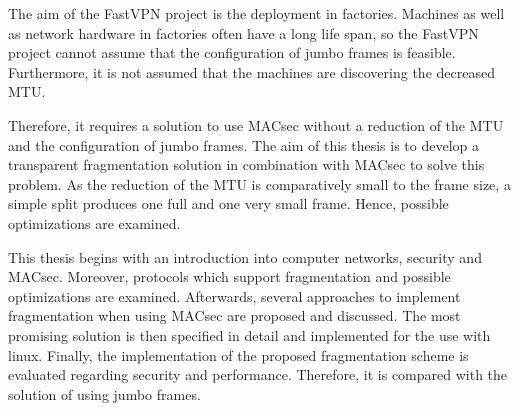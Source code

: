 The aim of the FastVPN project is the deployment in factories.
Machines as well as network hardware in factories often have a long life span, so the FastVPN project cannot assume that the configuration of jumbo frames is feasible.
Furthermore, it is not assumed that the machines are discovering the decreased \gls{MTU}.

Therefore, it requires a solution to use \gls{MACsec} without a reduction of the \gls{MTU} and the configuration of jumbo frames.
The aim of this thesis is to develop a transparent fragmentation solution in combination with \gls{MACsec} to solve this problem.
As the reduction of the \gls{MTU} is comparatively small to the frame size, a simple split produces one full and one very small frame.
Hence, possible optimizations are examined.

This thesis begins with an introduction into computer networks, security and \gls{MACsec}.
Moreover, protocols which support fragmentation and possible optimizations are examined.
Afterwards, several approaches to implement fragmentation when using \gls{MACsec} are proposed and discussed.
The most promising solution is then specified in detail and implemented for the use with linux.
Finally, the implementation of the proposed fragmentation scheme is evaluated regarding security and performance.
Therefore, it is compared with the solution of using jumbo frames.
